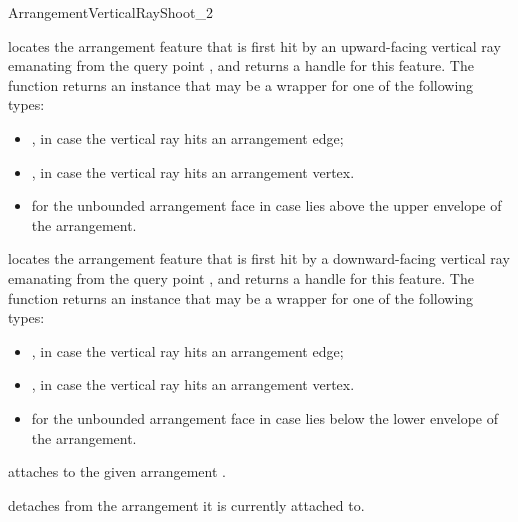 \begin{ccRefConcept}{ArrangementVerticalRayShoot_2}
  {locates the arrangement feature that is first hit by an upward-facing
   vertical ray emanating from the query point ,
   and returns a handle for this feature.
   The function returns an  instance that may be a wrapper for
   one of the following types:
   \begin{itemize}
   \item {}, in case the vertical
         ray hits an arrangement edge;
   \item {}, in case the vertical
         ray hits an arrangement vertex.
   \item {} for the unbounded arrangement
         face in case  lies above the upper envelope of the arrangement.
   \end{itemize}
   }

  {locates the arrangement feature that is first hit by a downward-facing
   vertical ray emanating from the query point ,
   and returns a handle for this feature.
   The function returns an  instance that may be a wrapper for
   one of the following types:
   \begin{itemize}
   \item {}, in case the vertical
         ray hits an arrangement edge;
   \item {}, in case the vertical
         ray hits an arrangement vertex.
   \item {} for the unbounded arrangement
         face in case  lies below the lower envelope of the arrangement.
   \end{itemize}
   }

\ccOperations

  {attaches \ccVar{} to the given arrangement .}

  {detaches \ccVar{} from the arrangement it is currently attached to.}

\ccHasModels

\\
 \\
\\
\\

\end{ccRefConcept}

\ccRefPageEnd
